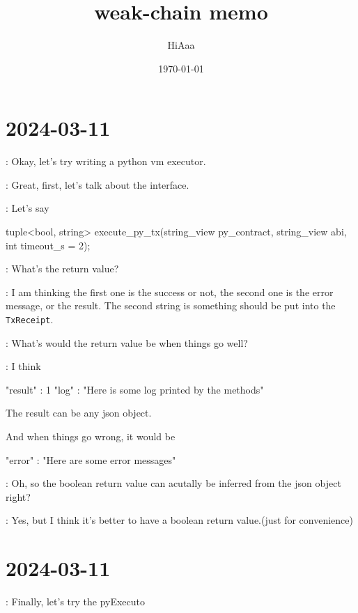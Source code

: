 \documentclass[dvipsnames]{article}
\title{weak-chain memo}
\date{\today}
\author{HiAaa}
\begin{document}
\maketitle
\tableofcontents{}
\newpage{}

% 
% 
% 


\section*{2024-03-11}

 :  Okay, let's try writing a python vm executor.

 : Great, first, let's talk about the interface.

 : Let's say

\begin{simplec}
tuple<bool, string> execute_py_tx(string_view py_contract, string_view abi, int timeout_s = 2);
\end{simplec}

 : What's the return value?

 : I am thinking the first one is the success or not, the second
one is the error message, or the result. The second string is something should
be put into the \texttt{TxReceipt}.

 : What's would the return value be when things go well?

 : I think

\begin{simplejs}
{
    "result" : 1
    "log" : "Here is some log printed by the methods"
}
\end{simplejs}

The result can be any json object.

And when things go wrong, it would be
\begin{simplejs}
{
    "error" : "Here are some error messages"
}
\end{simplejs}

 : Oh, so the boolean return value can acutally be inferred from
the json object right?

 : Yes, but I think it's better to have a boolean return
value.(just for convenience)

\section*{2024-03-11}

 : Finally, let's try the pyExecuto
\end{document}
